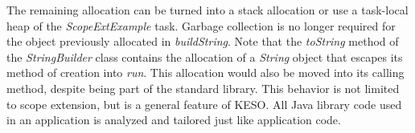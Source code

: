 		The remaining allocation can be turned into a stack allocation or use a task-local heap of the
		\emph{ScopeExtExample} task. Garbage collection is no longer required for the object previously allocated in
		\emph{buildString}. Note that the \emph{toString} method of the \emph{StringBuilder} class contains the allocation
		of a \emph{String} object that escapes its method of creation into \emph{run}. This allocation would also be moved
		into its calling method, despite being part of the standard library. This behavior is not limited to scope
		extension, but is a general feature of KESO\@. All Java library code used in an application is analyzed and tailored
		just like application code.
